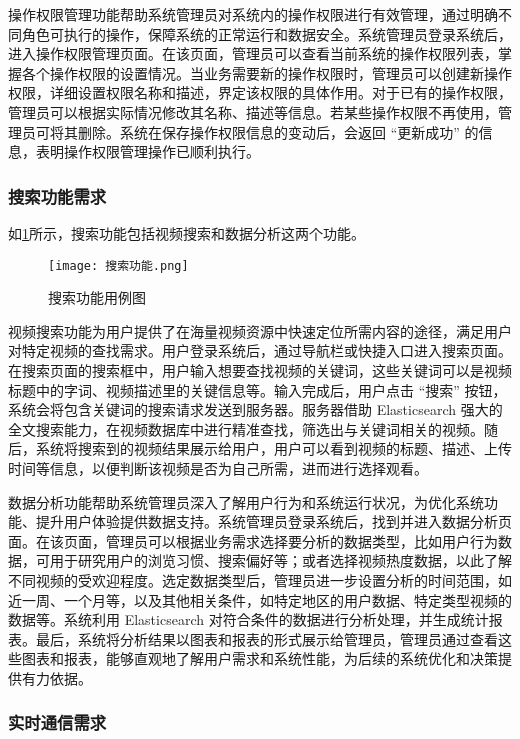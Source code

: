 操作权限管理功能帮助系统管理员对系统内的操作权限进行有效管理，通过明确不同角色可执行的操作，保障系统的正常运行和数据安全。系统管理员登录系统后，进入操作权限管理页面。在该页面，管理员可以查看当前系统的操作权限列表，掌握各个操作权限的设置情况。当业务需要新的操作权限时，管理员可以创建新操作权限，详细设置权限名称和描述，界定该权限的具体作用。对于已有的操作权限，管理员可以根据实际情况修改其名称、描述等信息。若某些操作权限不再使用，管理员可将其删除。系统在保存操作权限信息的变动后，会返回 “更新成功” 的信息，表明操作权限管理操作已顺利执行。

\subsubsection{搜索功能需求}

如\ref{搜索功能用例图}所示，搜索功能包括视频搜索和数据分析这两个功能。
\begin{figure}[hbt]
    \centering
    \texttt{[image: 搜索功能.png]}
    \caption{搜索功能用例图}
    \label{搜索功能用例图}
\end{figure}

视频搜索功能为用户提供了在海量视频资源中快速定位所需内容的途径，满足用户对特定视频的查找需求。用户登录系统后，通过导航栏或快捷入口进入搜索页面。在搜索页面的搜索框中，用户输入想要查找视频的关键词，这些关键词可以是视频标题中的字词、视频描述里的关键信息等。输入完成后，用户点击 “搜索” 按钮，系统会将包含关键词的搜索请求发送到服务器。服务器借助 Elasticsearch 强大的全文搜索能力，在视频数据库中进行精准查找，筛选出与关键词相关的视频。随后，系统将搜索到的视频结果展示给用户，用户可以看到视频的标题、描述、上传时间等信息，以便判断该视频是否为自己所需，进而进行选择观看。

数据分析功能帮助系统管理员深入了解用户行为和系统运行状况，为优化系统功能、提升用户体验提供数据支持。系统管理员登录系统后，找到并进入数据分析页面。在该页面，管理员可以根据业务需求选择要分析的数据类型，比如用户行为数据，可用于研究用户的浏览习惯、搜索偏好等；或者选择视频热度数据，以此了解不同视频的受欢迎程度。选定数据类型后，管理员进一步设置分析的时间范围，如近一周、一个月等，以及其他相关条件，如特定地区的用户数据、特定类型视频的数据等。系统利用 Elasticsearch 对符合条件的数据进行分析处理，并生成统计报表。最后，系统将分析结果以图表和报表的形式展示给管理员，管理员通过查看这些图表和报表，能够直观地了解用户需求和系统性能，为后续的系统优化和决策提供有力依据。

\subsubsection{实时通信需求}

